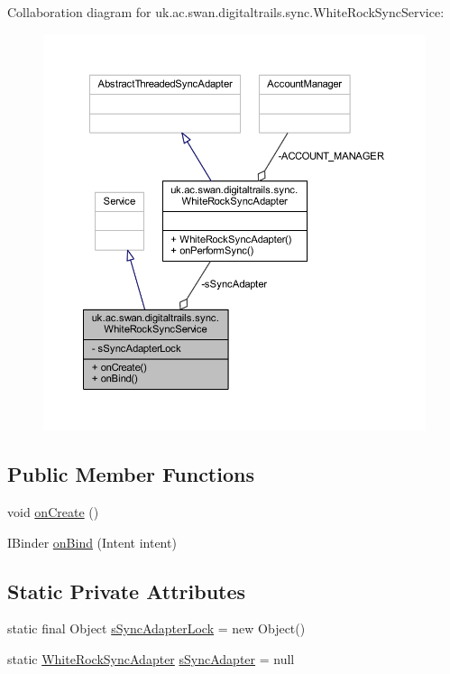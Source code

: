 Collaboration diagram for uk.\+ac.\+swan.\+digitaltrails.\+sync.\+White\+Rock\+Sync\+Service\+:
\nopagebreak
\begin{figure}[H]
\begin{center}
\leavevmode
\includegraphics[width=350pt]{classuk_1_1ac_1_1swan_1_1digitaltrails_1_1sync_1_1_white_rock_sync_service__coll__graph}
\end{center}
\end{figure}
\subsection*{Public Member Functions}
\begin{DoxyCompactItemize}
\item 
void \hyperlink{classuk_1_1ac_1_1swan_1_1digitaltrails_1_1sync_1_1_white_rock_sync_service_aab9d11343cac69ee35c8c99bae47e533}{on\+Create} ()
\item 
I\+Binder \hyperlink{classuk_1_1ac_1_1swan_1_1digitaltrails_1_1sync_1_1_white_rock_sync_service_a14e4c77debaf267eeca8093bcdc364ae}{on\+Bind} (Intent intent)
\end{DoxyCompactItemize}
\subsection*{Static Private Attributes}
\begin{DoxyCompactItemize}
\item 
static final Object \hyperlink{classuk_1_1ac_1_1swan_1_1digitaltrails_1_1sync_1_1_white_rock_sync_service_a1c81378a4490fb6ed65b681432687fe3}{s\+Sync\+Adapter\+Lock} = new Object()
\item 
static \hyperlink{classuk_1_1ac_1_1swan_1_1digitaltrails_1_1sync_1_1_white_rock_sync_adapter}{White\+Rock\+Sync\+Adapter} \hyperlink{classuk_1_1ac_1_1swan_1_1digitaltrails_1_1sync_1_1_white_rock_sync_service_aaa633b71a751392a2c72b33a30e96a05}{s\+Sync\+Adapter} = null
\end{DoxyCompactItemize}


